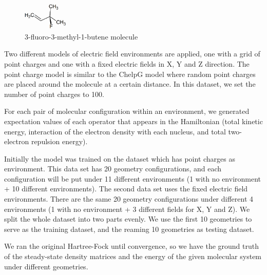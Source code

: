 \documentclass[twoside]{article}
\begin{document}
\begin{figure}[h!]

  \caption{3-fluoro-3-methyl-1-butene molecule}
  \label{fig:molecule}
    \centerline{\includegraphics[width=80px]{3-fluoro-3-methyl-1-butene.png}}
\end{figure}


Two different models of electric field environments are applied, one with a grid of point charges and one with a fixed electric fields in X, Y and Z direction. The point charge model is similar to the ChelpG model\cite{ChelpG} where random point charges are placed around the molecule at a certain distance. In this dataset, we set the number of point charges to 100.
 





For each pair of molecular configuration within an environment, we generated expectation values of each operator that appears in the Hamiltonian (total kinetic energy, interaction of the electron density with each nucleus, and total two-electron repulsion energy).

Initially the model was trained on the dataset which has point charges as environment. This data set has 20 geometry configurations, and each configuration will be put under 11 different environments (1 with no environment + 10 different environments). The second data set uses the fixed electric field environments. There are the same 20 geometry configurations under different 4 environments (1 with no environment + 3 different fields for X, Y and Z).  We split the whole dataset into two parts evenly. We use the first 10 geometries to serve as the training dataset, and the reaming 10 geometries as testing dataset.

We ran the original Hartree-Fock until convergence, so we have the ground truth of the steady-state density matrices and the energy of the given molecular system under different geometries. 
\end{document}
